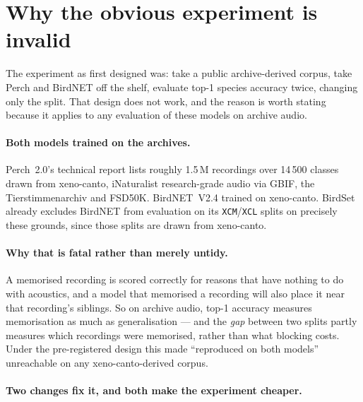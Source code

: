 \documentclass[10pt,twocolumn,a4paper]{article}
\begin{document}
\section{Why the obvious experiment is invalid}
\label{sec:design}

The experiment as first designed was: take a public archive-derived corpus, take Perch and
BirdNET off the shelf, evaluate top-1 species accuracy twice, changing only the split.
That design does not work, and the reason is worth stating because it applies to any
evaluation of these models on archive audio.

\paragraph{Both models trained on the archives.} Perch~2.0's technical report
\citep{perch2} lists roughly 1.5\,M recordings over 14\,500 classes drawn from xeno-canto,
iNaturalist research-grade audio via GBIF, the Tierstimmenarchiv and FSD50K. BirdNET~V2.4
\citep{birdnet2021} trained on xeno-canto. BirdSet already excludes BirdNET from evaluation
on its \texttt{XCM}/\texttt{XCL} splits on precisely these grounds, since those splits are
drawn from xeno-canto.

\paragraph{Why that is fatal rather than merely untidy.} A memorised recording is scored
correctly for reasons that have nothing to do with acoustics, and a model that memorised a
recording will also place it near that recording's siblings. So on archive audio, top-1
accuracy measures memorisation as much as generalisation --- and the \emph{gap} between two
splits partly measures which recordings were memorised, rather than what blocking costs.
Under the pre-registered design this made ``reproduced on both models'' unreachable on any
xeno-canto-derived corpus.

\paragraph{Two changes fix it, and both make the experiment cheaper.}
\end{document}
